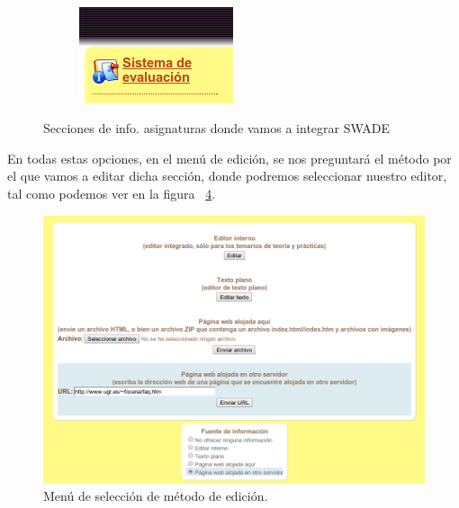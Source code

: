 \begin{figure}
\begin{subfigure}[b]{0.3\textwidth}
                \label{fig:inte_asig2}
        \end{subfigure}
        ~ %
        \begin{subfigure}[b]{0.3\textwidth}
                \includegraphics[width=\textwidth]{fig/inte_eva}
                \label{fig:inte_eva}
        \end{subfigure}
        \caption{Secciones de info. asignaturas donde vamos a integrar SWADE }\label{fig:asig}
\end{figure}


En todas estas opciones, en el menú de edición, se nos preguntará el método por el que vamos a editar dicha sección, donde podremos seleccionar nuestro editor, tal como podemos ver en la figura ~\ref{fig:inte_sel}. 
  

\begin{figure}[h!]
  \centering
      \includegraphics[width=7in]{fig/inte_sel}
  \caption{Menú de selección de método de edición.}
  \label{fig:inte_sel}

\end{figure}


